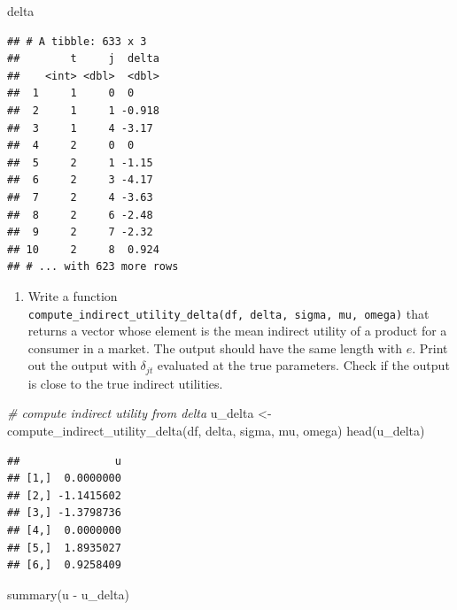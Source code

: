 \documentclass[
]{book}
\newenvironment{Shaded}{\begin{snugshade}}{\end{snugshade}}
\newcommand{\CommentTok}[1]{\textcolor[rgb]{0.56,0.35,0.01}{\textit{#1}}}
\newcommand{\FunctionTok}[1]{\textcolor[rgb]{0.00,0.00,0.00}{#1}}
\newcommand{\NormalTok}[1]{#1}
\newcommand{\OtherTok}[1]{\textcolor[rgb]{0.56,0.35,0.01}{#1}}
\newcommand{\SpecialCharTok}[1]{\textcolor[rgb]{0.00,0.00,0.00}{#1}}
\providecommand{\tightlist}{%
  \setlength{\itemsep}{0pt}\setlength{\parskip}{0pt}}
\begin{document}
\begin{Shaded}
\begin{Highlighting}[]
\NormalTok{delta}
\end{Highlighting}
\end{Shaded}

\begin{verbatim}
## # A tibble: 633 x 3
##        t     j  delta
##    <int> <dbl>  <dbl>
##  1     1     0  0    
##  2     1     1 -0.918
##  3     1     4 -3.17 
##  4     2     0  0    
##  5     2     1 -1.15 
##  6     2     3 -4.17 
##  7     2     4 -3.63 
##  8     2     6 -2.48 
##  9     2     7 -2.32 
## 10     2     8  0.924
## # ... with 623 more rows
\end{verbatim}

\begin{enumerate}
\def\labelenumi{\arabic{enumi}.}
\setcounter{enumi}{4}
\tightlist
\item
  Write a function \texttt{compute\_indirect\_utility\_delta(df,\ delta,\ sigma,\ mu,\ omega)} that returns a vector whose element is the mean indirect utility of a product for a consumer in a market. The output should have the same length with \(e\). Print out the output with \(\delta_{jt}\) evaluated at the true parameters. Check if the output is close to the true indirect utilities.
\end{enumerate}

\begin{Shaded}
\begin{Highlighting}[]
\CommentTok{\# compute indirect utility from delta}
\NormalTok{u\_delta }\OtherTok{\textless{}{-}}
  \FunctionTok{compute\_indirect\_utility\_delta}\NormalTok{(df, delta, sigma,}
\NormalTok{                                 mu, omega)}
\FunctionTok{head}\NormalTok{(u\_delta)}
\end{Highlighting}
\end{Shaded}

\begin{verbatim}
##               u
## [1,]  0.0000000
## [2,] -1.1415602
## [3,] -1.3798736
## [4,]  0.0000000
## [5,]  1.8935027
## [6,]  0.9258409
\end{verbatim}

\begin{Shaded}
\begin{Highlighting}[]
\FunctionTok{summary}\NormalTok{(u }\SpecialCharTok{{-}}\NormalTok{ u\_delta)}
\end{Highlighting}
\end{Shaded}
\end{document}
